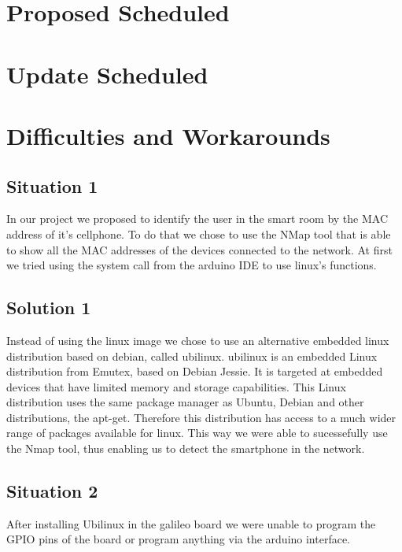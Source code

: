 \documentclass[12pt]{partialreport}
\begin{document}
\maketitle
\content

\section*{Proposed Scheduled}
\oldScheduleTable

\section*{Update Scheduled}
\newScheduleTable

\section*{Difficulties and Workarounds}
\subsection*{Situation 1}
In our project we proposed to identify the user in the smart room by the MAC address of it's cellphone. To do that we chose to use the NMap tool that is able to show all the MAC addresses of the devices connected to the network. At first we tried using the system call from the arduino IDE to use linux's functions.
\subsection*{Solution 1}
Instead of using the linux image we chose to use an alternative embedded linux distribution based on debian, called ubilinux. ubilinux is an embedded Linux distribution from Emutex, based on Debian Jessie. It is targeted at embedded devices that have limited memory and storage capabilities. This Linux distribution uses the same package manager as Ubuntu, Debian and other distributions, the apt-get. Therefore this distribution has access to a much wider range of packages available for linux. This way we were able to sucessefully use the Nmap tool, thus enabling us to detect the smartphone in the network.

\subsection*{Situation 2}
After installing Ubilinux in the galileo board we were unable to program the GPIO pins of the board or program anything via the arduino interface. 
\end{document}
